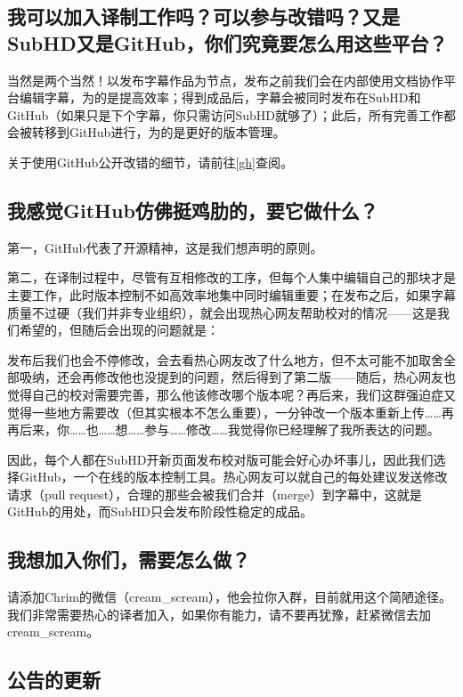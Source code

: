 \documentclass{ctexart}
\begin{document}
\subsection{我可以加入译制工作吗？可以参与改错吗？又是SubHD又是GitHub，你们究竟要怎么用这些平台？}

当然是两个当然！以发布字幕作品为节点，发布之前我们会在内部使用文档协作平台编辑字幕，为的是提高效率；得到成品后，字幕会被同时发布在SubHD和GitHub（如果只是下个字幕，你只需访问SubHD就够了）；此后，所有完善工作都会被转移到GitHub进行，为的是更好的版本管理。

关于使用GitHub公开改错的细节，请前往\ref{gh}查阅。

\subsection{我感觉GitHub仿佛挺鸡肋的，要它做什么？}

第一，GitHub代表了开源精神，这是我们想声明的原则。

第二，在译制过程中，尽管有互相修改的工序，但每个人集中编辑自己的那块才是主要工作，此时版本控制不如高效率地集中同时编辑重要；在发布之后，如果字幕质量不过硬（我们并非专业组织），就会出现热心网友帮助校对的情况——这是我们希望的，但随后会出现的问题就是：

发布后我们也会不停修改，会去看热心网友改了什么地方，但不太可能不加取舍全部吸纳，还会再修改他也没提到的问题，然后得到了第二版——随后，热心网友也觉得自己的校对需要完善，那么他该修改哪个版本呢？再后来，我们这群强迫症又觉得一些地方需要改（但其实根本不怎么重要），一分钟改一个版本重新上传……再再后来，你……也……想……参与……修改……我觉得你已经理解了我所表达的问题。

因此，每个人都在SubHD开新页面发布校对版可能会好心办坏事儿，因此我们选择GitHub，一个在线的版本控制工具。热心网友可以就自己的每处建议发送修改请求（pull request），合理的那些会被我们合并（merge）到字幕中，这就是GitHub的用处，而SubHD只会发布阶段性稳定的成品。

\subsection{我想加入你们，需要怎么做？}

请添加Chrim的微信（cream\_scream），他会拉你入群，目前就用这个简陋途径。我们非常需要热心的译者加入，如果你有能力，请不要再犹豫，赶紧微信去加cream\_scream。

\subsection{公告的更新}
\end{document}
